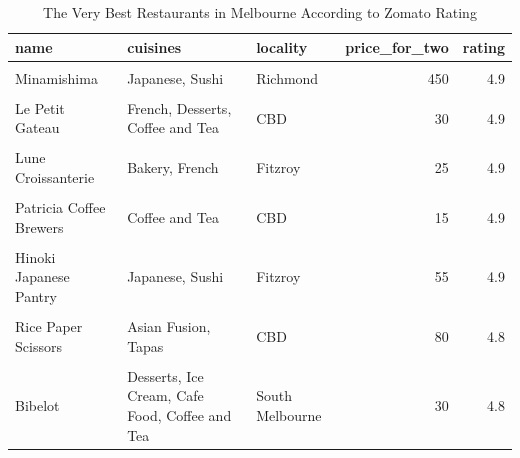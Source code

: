 \documentclass[11pt,a4paper,]{article}
\begin{document}
\begin{table}[!h]

\caption{\label{tab:best-restaurant}The Very Best Restaurants in Melbourne According to Zomato Rating}
\centering
\fontsize{8}{10}\selectfont
\begin{tabular}[t]{l|l|l|r|r}
\hline
name & cuisines & locality & price\_for\_two & rating\\
\hline
\cellcolor{pink}{Tipo 00} & \cellcolor{pink}{Italian} & \cellcolor{pink}{CBD} & \cellcolor{pink}{150} & \cellcolor{pink}{4.9}\\
\hline
Minamishima & Japanese, Sushi & Richmond & 450 & 4.9\\
\hline
\cellcolor{pink}{Dexter} & \cellcolor{pink}{American, BBQ} & \cellcolor{pink}{Preston} & \cellcolor{pink}{110} & \cellcolor{pink}{4.9}\\
\hline
Le Petit Gateau & French, Desserts, Coffee and Tea & CBD & 30 & 4.9\\
\hline
\cellcolor{pink}{Vue de monde} & \cellcolor{pink}{Australian, Contemporary} & \cellcolor{pink}{CBD} & \cellcolor{pink}{600} & \cellcolor{pink}{4.9}\\
\hline
Lune Croissanterie & Bakery, French & Fitzroy & 25 & 4.9\\
\hline
\cellcolor{pink}{Beatrix} & \cellcolor{pink}{Coffee and Tea, Bakery} & \cellcolor{pink}{North Melbourne} & \cellcolor{pink}{30} & \cellcolor{pink}{4.9}\\
\hline
Patricia Coffee Brewers & Coffee and Tea & CBD & 15 & 4.9\\
\hline
\cellcolor{pink}{Agathé Pâtisserie} & \cellcolor{pink}{Bakery, Patisserie} & \cellcolor{pink}{South Melbourne Market, South Melbourne} & \cellcolor{pink}{15} & \cellcolor{pink}{4.9}\\
\hline
Hinoki Japanese Pantry & Japanese, Sushi & Fitzroy & 55 & 4.9\\
\hline
\cellcolor{pink}{Humble Rays} & \cellcolor{pink}{Coffee and Tea, Cafe Food, Asian Fusion} & \cellcolor{pink}{Carlton} & \cellcolor{pink}{50} & \cellcolor{pink}{4.8}\\
\hline
Rice Paper Scissors & Asian Fusion, Tapas & CBD & 80 & 4.8\\
\hline
\cellcolor{pink}{Shanklin Cafe} & \cellcolor{pink}{Modern Australian, Coffee and Tea, Cafe Food} & \cellcolor{pink}{Hawthorn} & \cellcolor{pink}{50} & \cellcolor{pink}{4.8}\\
\hline
Bibelot & Desserts, Ice Cream, Cafe Food, Coffee and Tea & South Melbourne & 30 & 4.8\\

\end{tabular}
\end{table}
\end{document}
